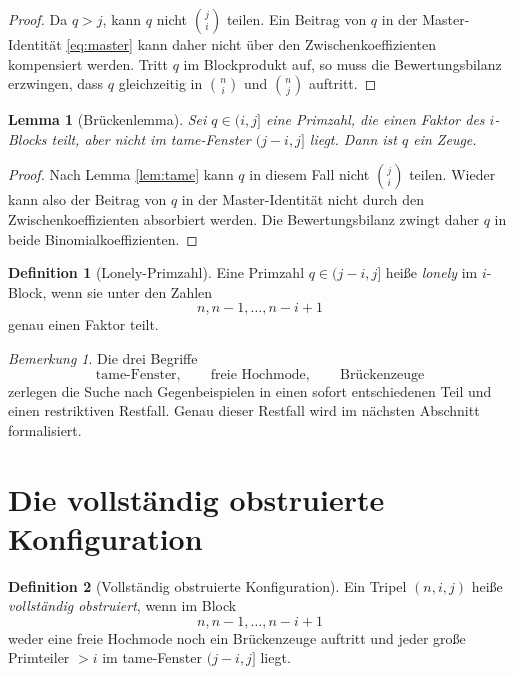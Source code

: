\documentclass[12pt,a4paper]{article}
\theoremstyle{plain}
\newtheorem{lemma}{Lemma}
\theoremstyle{definition}
\newtheorem{definition}{Definition}
\theoremstyle{remark}
\newtheorem{bemerkung}{Bemerkung}
\begin{document}
	\begin{proof}
		Da $q>j$, kann $q$ nicht $\binom{j}{i}$ teilen. 
		Ein Beitrag von $q$ in der Master-Identität \eqref{eq:master} kann daher nicht über den Zwischenkoeffizienten kompensiert werden. 
		Tritt $q$ im Blockprodukt auf, so muss die Bewertungsbilanz erzwingen, dass $q$ gleichzeitig in $\binom{n}{i}$ und $\binom{n}{j}$ auftritt.
	\end{proof}
	
	\begin{lemma}[Brückenlemma]\label{lem:bridge}
		Sei $q \in (i,j]$ eine Primzahl, die einen Faktor des $i$-Blocks teilt, aber nicht im tame-Fenster $(j-i,j]$ liegt. Dann ist $q$ ein Zeuge.
	\end{lemma}
	
	\begin{proof}
		Nach Lemma \ref{lem:tame} kann $q$ in diesem Fall nicht $\binom{j}{i}$ teilen. 
		Wieder kann also der Beitrag von $q$ in der Master-Identität nicht durch den Zwischenkoeffizienten absorbiert werden. 
		Die Bewertungsbilanz zwingt daher $q$ in beide Binomialkoeffizienten.
	\end{proof}
	
	\begin{definition}[Lonely-Primzahl]
		Eine Primzahl $q \in (j-i,j]$ heiße \emph{lonely} im $i$-Block, wenn sie unter den Zahlen
		\[
		n,n-1,\dots,n-i+1
		\]
		genau einen Faktor teilt.
	\end{definition}
	
	\begin{bemerkung}
		Die drei Begriffe
		\[
		\text{tame-Fenster},\qquad \text{freie Hochmode},\qquad \text{Brückenzeuge}
		\]
		zerlegen die Suche nach Gegenbeispielen in einen sofort entschiedenen Teil und einen restriktiven Restfall. 
		Genau dieser Restfall wird im nächsten Abschnitt formalisiert.
	\end{bemerkung}
	
	\section{Die vollständig obstruierte Konfiguration}
	
	\begin{definition}[Vollständig obstruierte Konfiguration]
		Ein Tripel $(n,i,j)$ heiße \emph{vollständig obstruiert}, wenn im Block
		\[
		n,n-1,\dots,n-i+1
		\]
		weder eine freie Hochmode noch ein Brückenzeuge auftritt und jeder große Primteiler $>i$ im tame-Fenster $(j-i,j]$ liegt.
	\end{definition}
	
\end{document}
